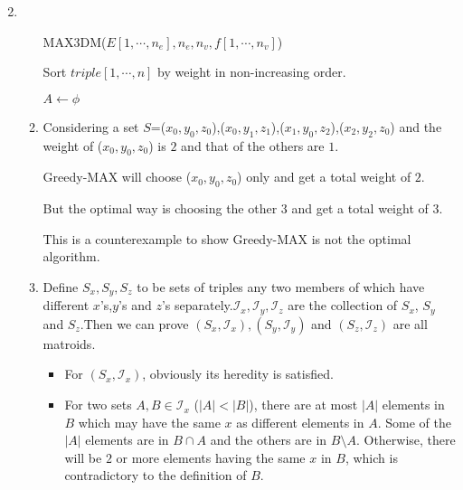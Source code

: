 \documentclass[12pt,a4paper]{article}
\makeatletter
\newtheorem*{solution}{Solution}
\theoremstyle{definition}
\renewenvironment{solution}[1][Solution] {\par\pushQED{\qed}\normalfont\topsep6\p@\@plus6\p@\relax\trivlist\item[\hskip\labelsep\bfseries#1\@addpunct{.}]\ignorespaces}{\popQED\endtrivlist\@endpefalse} \makeatother
\makeatother
\begin{document}
\begin{enumerate}
\begin{solution}
\begin{enumerate}
    		    \begin{minipage}[t]{0.90\textwidth}
    		    	\begin{algorithm}[H]
    		    		\BlankLine
    		    		\caption{MAX3DM($E[1,\cdots,n_e],n_e,n_v,f[1,\cdots,n_v]$)}
    		    		\label{Alg-MAX3DM}
    		    		
    		    		Sort $triple[1,\cdots,n]$ by weight in non-increasing order.
    		    		
    		    		$A \leftarrow \phi$\;
    		    		
    		    		
    		    		\;
    		    		
    		    	\end{algorithm}
    	    \end{minipage} 
            \item 
                Considering a set $S$={($x_0,y_0,z_0$),($x_0,y_1,z_1$),($x_1,y_0,z_2$),($x_2,y_2,z_0$)} and the weight of ($x_0,y_0,z_0$) is $2$ and that of the others are $1$.
                
                Greedy-MAX will choose ($x_0,y_0,z_0$) only and get a total weight of $2$.
                
                But the optimal way is choosing the other 3 and get a total weight of $3$.
                
                This is a counterexample to show Greedy-MAX is not the optimal algorithm.
            \item 
                Define $S_x,S_y,S_z$ to be sets of triples any two members of which have different $x$'s,$y$'s and $z$'s separately.$\mathcal{I}_x, \mathcal{I}_y, \mathcal{I}_z$ are the collection of $S_x$, $S_y$ and $S_z$.Then we can prove $(S_x,\mathcal{I}_x), (S_y,\mathcal{I}_y)$ and $(S_z,\mathcal{I}_z)$ are all matroids.
                \begin{itemize}
                	\item 
                
                For $(S_x,\mathcal{I}_x)$, obviously its heredity is satisfied.
                    \item
                For two sets $A,B \in \mathcal{I}_x$ ($|A|<|B|$), there are at most $|A|$ elements in $B$ which may have the same $x$ as different elements in $A$. Some of the $|A|$ elements are in $B\cap A$ and the others are in $B\setminus A$. Otherwise, there will be $2$ or more elements having the same $x$ in $B$, which is contradictory to the definition of $B$.
                

\end{itemize}
\end{enumerate}
\end{solution}
\end{enumerate}
\end{document}
